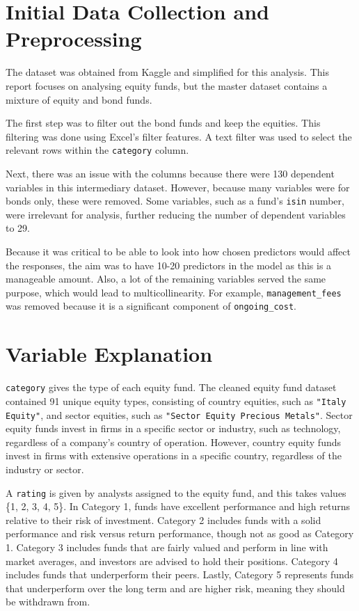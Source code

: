 \documentclass[11pt]{report} %
\begin{document}
\section{Initial Data Collection and Preprocessing}
The dataset was obtained from Kaggle and simplified for this analysis. This report focuses on analysing equity funds, but the master dataset contains a mixture of equity and bond funds. 

The first step was to filter out the bond funds and keep the equities. This filtering was done using Excel's filter features. A text filter was used to select the relevant rows within the \texttt{category} column. 

Next, there was an issue with the columns because there were 130 dependent variables in this intermediary dataset. However, because many variables were for bonds only, these were removed. Some variables, such as a fund's \texttt{isin} number, were irrelevant for analysis, further reducing the number of dependent variables to 29. 

Because it was critical to be able to look into how chosen predictors would affect the responses, the aim was to have 10-20 predictors in the model as this is a manageable amount. Also, a lot of the remaining variables served the same purpose, which would lead to multicollinearity. For example, \texttt{management\_fees} was removed because it is a significant component of \texttt{ongoing\_cost}.

\vspace{-0.2cm}
\section{Variable Explanation}
\texttt{category} gives the type of each equity fund. The cleaned equity fund dataset contained 91 unique equity types, consisting of country equities, such as \texttt{"Italy Equity"}, and sector equities, such as \texttt{"Sector Equity Precious Metals"}. Sector equity funds invest in firms in a specific sector or industry, such as technology, regardless of a company's country of operation. However, country equity funds invest in firms with extensive operations in a specific country, regardless of the industry or sector. 

A \texttt{rating} is given by analysts assigned to the equity fund, and this takes values \{1, 2, 3, 4, 5\}. In Category 1, funds have excellent performance and high returns relative to their risk of investment. Category 2 includes funds with a solid performance and risk versus return performance, though not as good as Category 1. Category 3 includes funds that are fairly valued and perform in line with market averages, and investors are advised to hold their positions. Category 4 includes funds that underperform their peers. Lastly, Category 5 represents funds that underperform over the long term and are higher risk, meaning they should be withdrawn from.
\end{document}

